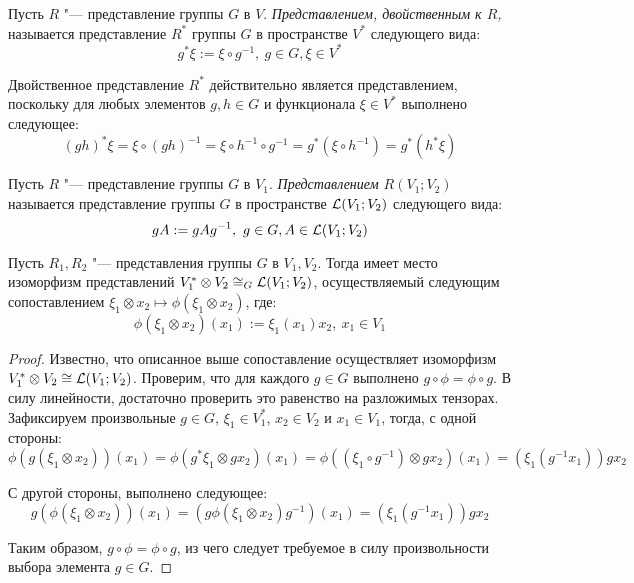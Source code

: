 \begin{definition}
	Пусть $R$ "--- представление группы $G$ в $V$. \textit{Представлением, двойственным к $R$,} называется представление $R^*$ группы $G$ в пространстве $V^*$ следующего вида:
	\[g^*\xi := \xi\circ g^{-1},~g \in G, \xi \in V^*\]
\end{definition}

\begin{note}
	Двойственное представление $R^*$ действительно является представлением, поскольку для любых элементов $g, h \in G$ и функционала $\xi \in V^*$ выполнено следующее:
	\[(gh)^*\xi = \xi \circ (gh)^{-1} = \xi \circ h^{-1} \circ g^{-1} = g^*(\xi \circ h^{-1})= g^*(h^*\xi)\]
\end{note}

\begin{definition}
	Пусть $R$ "--- представление группы $G$ в $V_1$. \textit{Представлением $R(V_1; V_2)$} называется представление группы $G$ в пространстве $\mathcal L(V_1; V_2)$ следующего вида:
	\[gA := gAg^{-1},~g \in G, A \in \mathcal L(V_1; V_2)\]
\end{definition}

\begin{proposition}
	Пусть $R_1, R_2$ "--- представления группы $G$ в $V_1, V_2$. Тогда имеет место изоморфизм представлений $V_1^* \otimes V_2 \cong_G \mathcal L(V_1; V_2)$, осуществляемый следующим сопоставлением $\xi_1 \otimes x_2 \mapsto \phi(\xi_1 \otimes x_2)$, где:
	\[\phi(\xi_1 \otimes x_2)(x_1) := \xi_1(x_1)x_2,~x_1 \in V_1\]
\end{proposition}

\begin{proof}
	Известно, что описанное выше сопоставление осуществляет изоморфизм $V_1^* \otimes V_2 \cong \mathcal L(V_1; V_2)$. Проверим, что для каждого $g \in G$ выполнено $g \circ \phi = \phi \circ g$. В силу линейности, достаточно проверить это равенство на разложимых тензорах. Зафиксируем произвольные $g \in G$, $\xi_1 \in V_1^*$, $x_2 \in V_2$ и $x_1 \in V_1$, тогда, с одной стороны:
	\[\phi(g(\xi_1 \otimes x_2))(x_1) = \phi(g^*\xi_1 \otimes gx_2)(x_1) = \phi((\xi_1 \circ g^{-1}) \otimes gx_2)(x_1) = (\xi_1(g^{-1}x_1))gx_2\]
	
	С другой стороны, выполнено следующее:
	\[g(\phi(\xi_1 \otimes x_2))(x_1) = (g\phi(\xi_1 \otimes x_2)g^{-1})(x_1) = (\xi_1(g^{-1}x_1))gx_2\]
	
	Таким образом, $g \circ \phi = \phi \circ g$, из чего следует требуемое в силу произвольности выбора элемента $g \in G$.
\end{proof}

